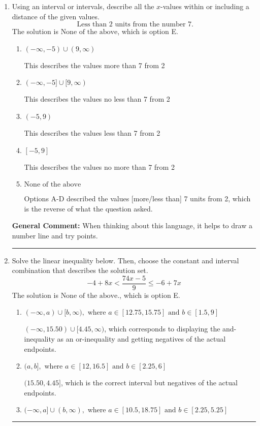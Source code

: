 \documentclass{extbook}[14pt]
\newcommand{\litem}[1]{\item #1

\rule{\textwidth}{0.4pt}}
\begin{document}
\begin{enumerate}
{\textbf{General Comment:} Remember that less/greater than or equal to includes the endpoint, while less/greater do not. Also, remember that you need to flip the inequality when you multiply or divide by a negative.
}
\litem{
Using an interval or intervals, describe all the $x$-values within or including a distance of the given values.
\[ \text{ Less than } 2 \text{ units from the number } 7. \]The solution is \( \text{None of the above} \), which is option E.\begin{enumerate}[label=\Alph*.]
\item \( (-\infty, -5) \cup (9, \infty) \)

This describes the values more than 7 from 2
\item \( (-\infty, -5] \cup [9, \infty) \)

This describes the values no less than 7 from 2
\item \( (-5, 9) \)

This describes the values less than 7 from 2
\item \( [-5, 9] \)

This describes the values no more than 7 from 2
\item \( \text{None of the above} \)

Options A-D described the values [more/less than] 7 units from 2, which is the reverse of what the question asked.
\end{enumerate}

\textbf{General Comment:} When thinking about this language, it helps to draw a number line and try points.
}
\litem{
Solve the linear inequality below. Then, choose the constant and interval combination that describes the solution set.
\[ -4 + 8 x < \frac{74 x - 5}{9} \leq -6 + 7 x \]The solution is \( \text{None of the above.} \), which is option E.\begin{enumerate}[label=\Alph*.]
\item \( (-\infty, a) \cup [b, \infty), \text{ where } a \in [12.75, 15.75] \text{ and } b \in [1.5, 9] \)

$(-\infty, 15.50) \cup [4.45, \infty)$, which corresponds to displaying the and-inequality as an or-inequality and getting negatives of the actual endpoints.
\item \( (a, b], \text{ where } a \in [12, 16.5] \text{ and } b \in [2.25, 6] \)

$(15.50, 4.45]$, which is the correct interval but negatives of the actual endpoints.
\item \( (-\infty, a] \cup (b, \infty), \text{ where } a \in [10.5, 18.75] \text{ and } b \in [2.25, 5.25] \)


\end{enumerate}}
\end{enumerate}
\end{document}
